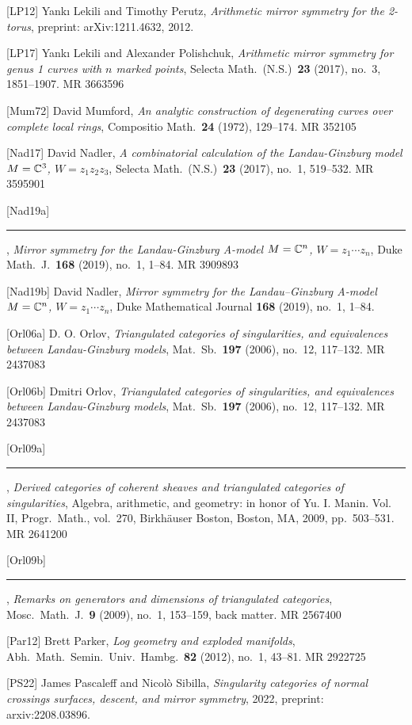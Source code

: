 [LP12] Yank{\i} Lekili and Timothy Perutz, \emph{Arithmetic mirror symmetry for the
2-torus}, preprint: arXiv:1211.4632, 2012.

[LP17] Yank{\i} Lekili and Alexander Polishchuk, \emph{Arithmetic mirror symmetry for
genus 1 curves with $n$ marked points}, Selecta Math.\ (N.S.)\ \textbf{23} (2017),
no.~3, 1851--1907. MR 3663596

[Mum72] David Mumford, \emph{An analytic construction of degenerating curves over
complete local rings}, Compositio Math.\ \textbf{24} (1972), 129--174. MR 352105

[Nad17] David Nadler, \emph{A combinatorial calculation of the Landau-Ginzburg model
$M=\mathbb{C}^3$, $W=z_1z_2z_3$}, Selecta Math.\ (N.S.)\ \textbf{23} (2017), no.~1, 519--532.
MR 3595901

[Nad19a] \rule[0.4ex]{2.6em}{0.4pt} , \emph{Mirror symmetry for the Landau-Ginzburg
A-model $M=\mathbb{C}^n$, $W=z_1\cdots z_n$}, Duke Math.\ J.\ \textbf{168} (2019), no.~1,
1--84. MR 3909893


[Nad19b] David Nadler, \emph{Mirror symmetry for the Landau--Ginzburg A-model $M=\mathbb{C}^n$,
$W=z_1\cdots z_n$}, Duke Mathematical Journal \textbf{168} (2019), no.~1, 1--84.

[Orl06a] D. O. Orlov, \emph{Triangulated categories of singularities, and equivalences
between Landau-Ginzburg models}, Mat.\ Sb.\ \textbf{197} (2006), no.~12, 117--132.
MR 2437083

[Orl06b] Dmitri Orlov, \emph{Triangulated categories of singularities, and equivalences
between Landau-Ginzburg models}, Mat.\ Sb.\ \textbf{197} (2006), no.~12, 117--132.
MR 2437083

[Orl09a] \rule[0.4ex]{2.6em}{0.4pt} , \emph{Derived categories of coherent sheaves and
triangulated categories of singularities}, Algebra, arithmetic, and geometry: in honor
of Yu. I. Manin. Vol. II, Progr.\ Math., vol.~270, Birkh{\"a}user Boston, Boston, MA,
2009, pp.~503--531. MR 2641200

[Orl09b] \rule[0.4ex]{2.6em}{0.4pt} , \emph{Remarks on generators and dimensions of
triangulated categories}, Mosc.\ Math.\ J.\ \textbf{9} (2009), no.~1, 153--159, back
matter. MR 2567400

[Par12] Brett Parker, \emph{Log geometry and exploded manifolds}, Abh.\ Math.\ Semin.\
Univ.\ Hambg.\ \textbf{82} (2012), no.~1, 43--81. MR 2922725

[PS22] James Pascaleff and Nicol{\`o} Sibilla, \emph{Singularity categories of normal
crossings surfaces, descent, and mirror symmetry}, 2022, preprint: arxiv:2208.03896.

